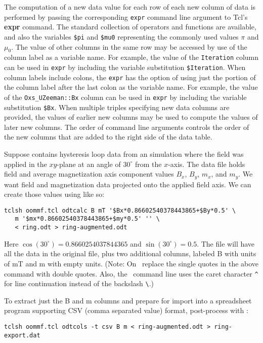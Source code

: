 The computation of a new data value for each row of each new column of
data is performed by passing the corresponding {\tt expr} command line
argument to Tcl's {\bf expr} command.  The standard collection of
operators and functions are available, and also the variables {\tt \$pi}
and {\tt \$mu0} representing the commonly used values $\pi$ and $\mu_0$.
The value of other columns in the same row may be accessed by use of the
column label as a variable name.  For example, the value of the
{\tt Iteration} column can be used in {\tt expr} by including the variable
substitution {\tt \$Iteration}.  When column labels include colons, the
{\tt expr} has the option of using just the portion of the column label
after the last colon as the variable name.  For example, the value of the
{\tt Oxs\_UZeeman::Bx} column can be used in {\tt expr} by including the
variable substitution {\tt \$Bx}.  When multiple triples specifying new
data columns are provided, the values of earlier new columns may be used
to compute the values of later new columns.  The order of command line
arguments controls the order of the new columns that are added to the
right side of the data table.

Suppose  contains hysteresis loop data from an 
simulation where the field was applied in the $xy$-plane at an angle of
$30^\circ$ from the $x$-axis.  The data file holds field and average
magnetization axis component values $B_x$, $B_y$, $m_x$, and $m_y$.  We
want field and magnetization data projected onto the applied field
axis.  We can create those values using  like so:
\begin{verbatim}
tclsh oommf.tcl odtcalc B mT '$Bx*0.86602540378443865+$By*0.5' \
   m '$mx*0.86602540378443865+$my*0.5' '' \
   < ring.odt > ring-augmented.odt
\end{verbatim}
Here $\cos(30^\circ)=0.8660254037844365$ and $\sin(30^\circ)=0.5$.  The
 file will have all the data in the original
\fn{ring.odt} file, plus two additional columns, labeled B with
units of mT and m with empty units.  (Note: On \Windows\ replace the
single quotes in the above command with double quotes.  Also, the
\Windows\ command line uses the caret character \verb+^+ for line
continuation instead of the backslash \verb+\+.)

To extract just the B and m columns and prepare for import into a
spreadsheet program supporting CSV (comma separated value) format,
post-process with \app{odtcols}:
\begin{verbatim}
tclsh oommf.tcl odtcols -t csv B m < ring-augmented.odt > ring-export.dat
\end{verbatim}


